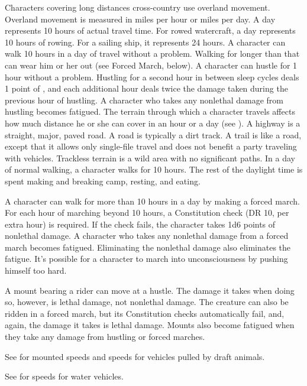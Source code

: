 Characters covering long distances cross-country use overland movement. Overland movement is measured in miles per hour or miles per day. A day represents 10 hours of actual travel time. For rowed watercraft, a day represents 10 hours of rowing. For a sailing ship, it represents 24 hours.
 A character can walk 10 hours in a day of travel without a problem. Walking for longer than that can wear him or her out (see Forced March, below).
 A character can hustle for 1 hour without a problem. Hustling for a second hour in between sleep cycles deals 1 point of , and each additional hour deals twice the damage taken during the previous hour of hustling. A character who takes any nonlethal damage from hustling becomes fatigued.
 The terrain through which a character travels affects how much distance he or she can cover in an hour or a day (see ). A highway is a straight, major, paved road. A road is typically a dirt track. A trail is like a road, except that it allows only single-file travel and does not benefit a party traveling with vehicles. Trackless terrain is a wild area with no significant paths.
 In a day of normal walking, a character walks for 10 hours. The rest of the daylight time is spent making and breaking camp, resting, and eating.

A character can walk for more than 10 hours in a day by making a forced march. For each hour of marching beyond 10 hours, a Constitution check (DR 10,  per extra hour) is required. If the check fails, the character takes 1d6 points of nonlethal damage. A character who takes any nonlethal damage from a forced march becomes fatigued. Eliminating the nonlethal damage also eliminates the fatigue. It's possible for a character to march into unconsciousness by pushing himself too hard.

 A mount bearing a rider can move at a hustle. The damage it takes when doing so, however, is lethal damage, not nonlethal damage. The creature can also be ridden in a forced march, but its Constitution checks automatically fail, and, again, the damage it takes is lethal damage. Mounts also become fatigued when they take any damage from hustling or forced marches.

See  for mounted speeds and speeds for vehicles pulled by draft animals.

 See  for speeds for water vehicles.

